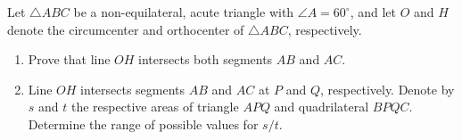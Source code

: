 \usepackage{enumitem}

Let $\triangle{ABC}$ be a non-equilateral, acute triangle with $\angle A=60^\circ$, and let $O$ and $H$ denote the circumcenter and orthocenter of $\triangle{ABC}$, respectively.

\begin{enumerate}[label=(\alph*)]
	\item Prove that line $OH$ intersects both segments $AB$ and $AC$.
	\item Line $OH$ intersects segments $AB$ and $AC$ at $P$ and $Q$, respectively. Denote by $s$ and $t$ the respective areas of triangle $APQ$ and quadrilateral $BPQC$. Determine the range of possible values for $s/t$.
\end{enumerate}